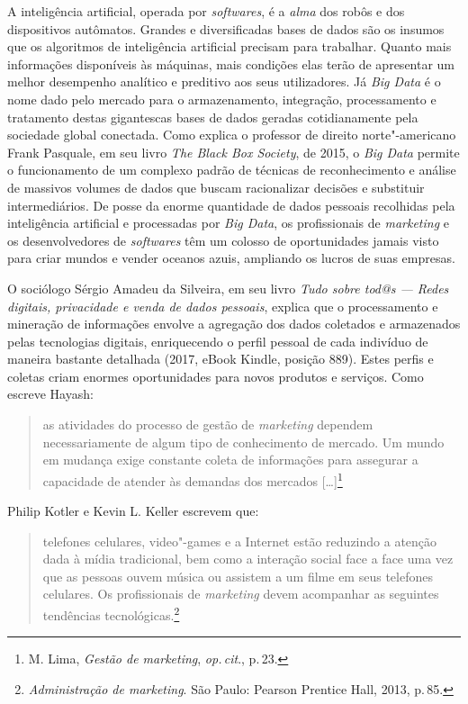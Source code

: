 A inteligência artificial, operada por \textit{softwares}, é a \textit{alma}
dos robôs e dos dispositivos autômatos. Grandes e diversificadas bases
de dados são os insumos que os algoritmos de inteligência artificial
precisam para trabalhar. Quanto mais informações disponíveis às
máquinas, mais condições elas terão de apresentar um melhor desempenho
analítico e preditivo aos seus utilizadores. Já \textit{Big Data} é o nome
dado pelo mercado para o armazenamento, integração, processamento e
tratamento destas gigantescas bases de dados geradas cotidianamente pela
sociedade global conectada. Como explica o professor de direito
norte"-americano Frank Pasquale, em seu livro \textit{The Black Box
Society}, de 2015, o \textit{Big Data} permite o funcionamento de um
complexo padrão de técnicas de reconhecimento e análise de massivos
volumes de dados que buscam racionalizar decisões e substituir
intermediários. De posse da enorme quantidade de dados pessoais
recolhidas pela inteligência artificial e processadas por \textit{Big
Data}, os profissionais de \textit{marketing} e os desenvolvedores de \textit{softwares}
têm um colosso de oportunidades jamais visto para criar mundos e vender
oceanos azuis, ampliando os lucros de suas empresas.

O sociólogo Sérgio Amadeu da Silveira, em seu livro \textit{Tudo sobre tod@s --- Redes digitais, privacidade e venda
de dados pessoais}, explica que o processamento e mineração de
informações envolve a agregação dos dados coletados e armazenados pelas
tecnologias digitais, enriquecendo o perfil pessoal de cada indivíduo de
maneira bastante detalhada (2017, eBook Kindle, posição 889). Estes
perfis e coletas criam enormes oportunidades para novos produtos e
serviços. Como escreve Hayash:

\begin{quote}
as atividades do processo de gestão de \textit{marketing} dependem necessariamente de algum tipo de conhecimento de mercado. Um mundo em mudança exige constante coleta de
informações para assegurar a capacidade de atender às demandas dos
mercados {[}\ldots{}{]}\footnote{M. Lima, \textit{Gestão de marketing}, \textit{op.\,cit}., p.\,23.}
\end{quote}

Philip Kotler e Kevin L. Keller escrevem que:

\begin{quote}
telefones celulares, video"-games e a Internet estão reduzindo a
atenção dada à mídia tradicional, bem como a interação social face a
face uma vez que as pessoas ouvem música ou assistem a um filme em seus
telefones celulares. Os profissionais de \textit{marketing} devem acompanhar as
seguintes tendências tecnológicas.\footnote{\textit{Administração de
marketing}. São Paulo: Pearson Prentice Hall, 2013, p.\,85.}
\end{quote}

